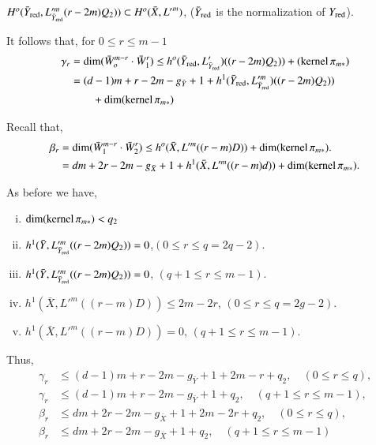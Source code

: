 {\noindent
$H^o(\bar{Y}_{\operatorname{red}},L'^{m}_{\bar{Y}_{\operatorname{red}}} (r -2m) Q_2)) \subset H^o
(\bar{X}, {L'}^{m})$, ($\bar{Y}_{\operatorname{red}}$ is the normalization of
$Y_{\operatorname{red}}$). 

\noindent
It follows that, for $0 \le r \le m-1$
\begin{align*}
\gamma_r & = \dim (\bar{W}^{m-r}_o \cdot \bar{W}^{r}_{1}) \le h^o
(\bar{Y}_{\operatorname{red}}, L'_{\bar{Y}_{\operatorname{red}}}) ((r-2m) Q_2)) +  (\operatorname{kernel}
\pi_{m*})\\ 
& = (d-1)m + r-2m - g_{\bar{Y}} + 1 + h^1 (\bar{Y}_{\operatorname{red}},
L'^{m}_{\bar{Y}_{\operatorname{red}}})((r-2m)Q_2))\\ 
&\qquad+ \dim (\operatorname{kernel} \pi_{m*}) 
\end{align*}

\noindent
Recall that, 
\begin{align*}
\beta_r&= \dim (\bar{W}^{m-r}_1 \cdot \bar{W}^{r}_{2})
\le h^o (\bar{X}, L'^{m} ((r-m)D)) + \dim (\operatorname{kernel}  \pi_{m*}).\\ 
&= dm +2r -2m - g_{\bar{X}} + 1 + h^{1} (\bar{X}, L'^{m} ((r-m)d)) +
\dim (\operatorname{kernel} \pi_{m*}). 
\end{align*}

\noindent
As before we have,
\begin{enumerate}[i)]
\item $\dim (\operatorname{kernel} \pi_{m*}) < q_2$ 

\item $h^1 (\bar{Y}, L'^{m}_{\bar{Y}_{\operatorname{red}}} ((r-2m)Q_2)) =
  0$,\pageoriginale \quad    $(0 \leq r \leq q = 2q-2)$. 

\item $h^1 (\bar{Y}, L'^{m}_{\bar{Y}_{\operatorname{red}}} ((r-2m)Q_2)) = 0$, \quad 
$(q +  1 \le r \le m-1)$. 

\item $h^1 (\bar{X}, L'^{m} ((r-m)D)) \le 2m - 2r$, \quad $(0 \le r \le q =
  2g - 2)$. 

\item $h^1 (\bar{X}, L'^{m} ((r-m)D)) = 0$,  \quad $(q + 1 \le r \le m-1)$. 
\end{enumerate}

\noindent
Thus,
\begin{align*}
\gamma_r & \le (d-1) m + r - 2m - g_{\bar{Y}} + 1+ 2m-r +q_2, \quad (0 \le
r \le q),\\ 
\gamma_r & \le (d-1) m + r - 2m - g_{\bar{Y}} + 1+ q_2, \quad (q+ 1 \le r
\le m-1),\\ 
\beta_r & \le dm + 2r - 2m - g_{\bar{X}} + 1 + 2m - 2r +q_2, \quad (0 \le r
\le q),\\  
\beta_r & \le dm + 2r - 2m - g_{\bar{X}} + 1 + q_2,  \quad (q + 1 \le r \le
m-1) 
\end{align*}

}
